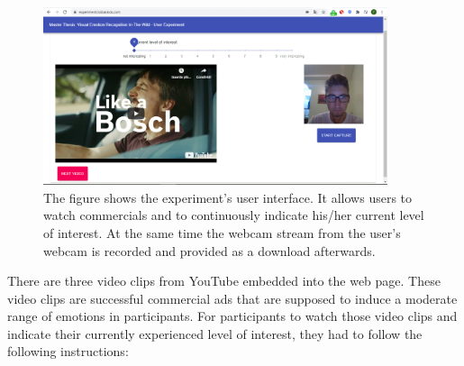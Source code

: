 \begin{center}
\begin{figure}[htbp]
  \begin{center}
  \includegraphics[angle=0, width=0.9\textwidth]{Figures/UserExperiment.PNG}
  \caption[Implemented UI for the user experiment]{The figure shows the experiment's user interface. It allows users to watch commercials and to continuously indicate his/her current level of interest. At the same time the webcam stream from the user's webcam is recorded and provided as a download afterwards.}
  \label{fig:InterfaceUserExperiment}
  \end{center}
\end{figure}
\end{center}

\noindent There are three video clips from YouTube embedded into the web page. These video clips are successful commercial ads that are supposed to induce a moderate range of emotions in participants.
\newline\newline
For participants to watch those video clips and indicate their currently experienced level of interest, they had to follow the following instructions:

